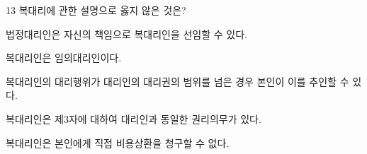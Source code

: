 \begin{question}{13}
복대리에 관한 설명으로 옳지 않은 것은?
\begin{choices}
  \item 법정대리인은 자신의 책임으로 복대리인을 선임할 수 있다.
  \item 복대리인은 임의대리인이다.
  \item 복대리인의 대리행위가 대리인의 대리권의 범위를 넘은 경우 본인이 이를 추인할 수 있다.
  \item 복대리인은 제3자에 대하여 대리인과 동일한 권리의무가 있다.
  \item 복대리인은 본인에게 직접 비용상환을 청구할 수 없다.
\end{choices}
\end{question}
